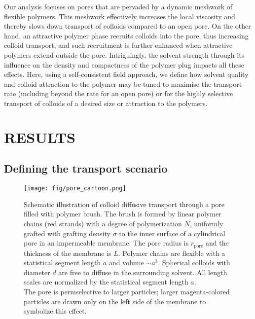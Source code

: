 \documentclass[12pt, a4paper]{article}
\begin{document}

Our analysis focuses on pores that are pervaded by a dynamic meshwork of flexible polymers. 
This meshwork effectively increases the local viscosity and thereby slows down transport of colloids compared to an open pore. 
On the other hand, an attractive polymer phase recruits colloids into the pore, thus increasing colloid transport, 
and such recruitment is further enhanced when attractive polymers extend outside the pore. 
Intriguingly, the solvent strength through its influence on the density and compactness of the polymer plug impacts all these effects. 
Here, using a self-consistent field approach, we define how solvent quality and colloid attraction to the polymer may be tuned 
to maximise the transport rate (including beyond the rate for an open pore) or for the highly selective transport of colloids of a desired size or attraction to the polymers.


\section{RESULTS}


\subsection{Defining the transport scenario}

\begin{figure}
    \centering
    \texttt{[image: fig/pore\_cartoon.png]}
    \caption{
        Schematic illustration of colloid diffusive transport through a pore filled with polymer brush. 
        The brush is formed by linear polymer chains (red strands) with a degree of polymerization $N$, uniformly grafted with grafting density $\sigma$ 
        to the inner surface of a cylindrical pore in an impermeable membrane. The pore radius is $r_{\text{pore}}$ and the thickness of the membrane is $L$.
        Polymer chains are flexible with a statistical segment length $a$ and volume $\sim a^3$. 
        Spherical colloids with diameter $d$ are free to diffuse in the surrounding solvent.
        All length scales are normalized by the statistical segment length $a$.
        \\
        The pore is permselective to larger particles; larger magenta-colored particles are drawn only on the left side of the membrane to symbolize this effect.
        }
    \label{fig:colloid_transport}
\end{figure}
\end{document}
